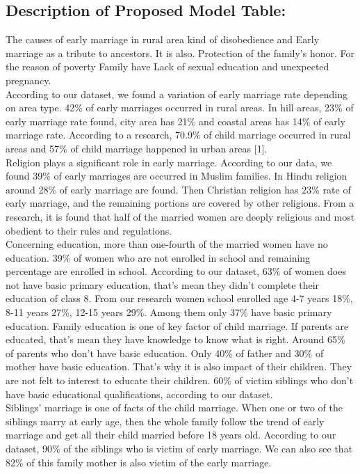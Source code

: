 \documentclass{article}
\begin{document}
        \subsection {Description of Proposed Model Table:}
        The causes of early marriage in rural area kind of disobedience and Early marriage as a tribute to ancestors. It is also. Protection of the family's honor. For the reason of poverty Family have Lack of sexual education and unexpected pregnancy. \\
        According to our dataset, we found a variation of early marriage rate depending on area type. 42\% of early marriages occurred in rural areas. In hill areas, 23\% of early marriage rate found, city area has 21\% and coastal areas has 14\% of early marriage rate. According to a research, 70.9\% of child marriage occurred in rural areas and 57\% of child marriage happened in urban areas [1]. \\
        Religion plays a significant role in early marriage. According to our data, we found 39\% of early marriages are occurred in Muslim families. In Hindu religion around 28\% of early marriage are found. Then Christian religion has 23\% rate of early marriage, and the remaining portions are covered by other religions. From a research, it is found that half of the married women are deeply religious and most obedient to their rules and regulations. \\
        Concerning education, more than one-fourth of the married women have no education. 39\% of women who are not enrolled in school and remaining percentage are enrolled in school. According to our dataset, 63\% of women does not have basic primary education, that’s mean they didn’t complete their education of class 8. From our research women school enrolled age 4-7 years 18\%, 8-11 years 27\%, 12-15 years 29\%. Among them only 37\% have basic primary education. Family education is one of key factor of child marriage. If parents are educated, that’s mean they have knowledge to know what is right. Around 65\% of parents who don’t have basic education. Only 40\% of father and 30\% of mother have basic education. That’s why it is also impact of their children. They are not felt to interest to educate their children. 60\% of victim siblings who don’t have basic educational qualifications, according to our dataset. \\
        Siblings' marriage is one of facts of the child marriage. When one or two of the siblings marry at early age, then the whole family follow the trend of early marriage and get all their child married before 18 years old. According to our dataset, 90\% of the siblings who is victim of early marriage. We can also see that 82\% of this family mother is also victim of the early marriage. \\
\end{document}
